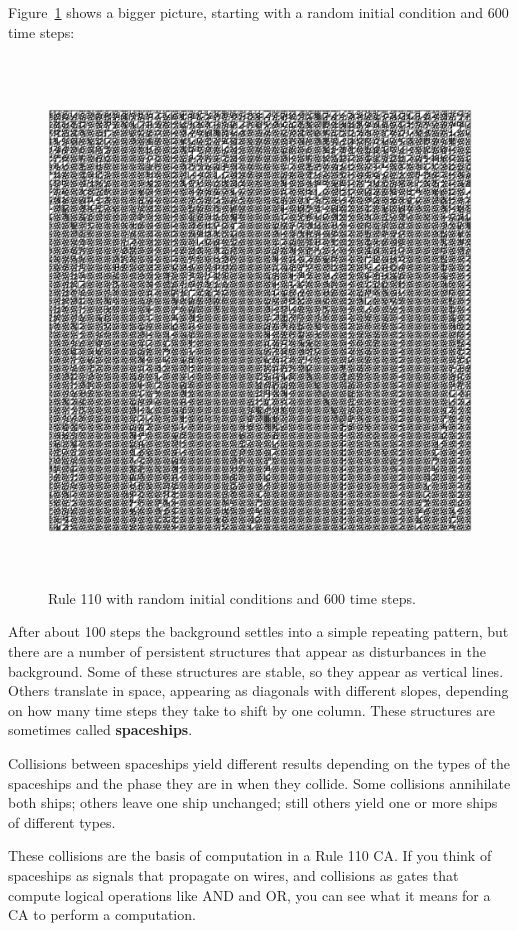\documentclass[10pt]{book}
\begin{document}
Figure~\ref{rule110} shows a bigger picture, starting with a random initial
condition and 600 time steps:

\begin{figure}
\centerline{\includegraphics[width=5.5in,height=5.5in]{figs/rule-110-600-random.pdf}}
\caption{Rule 110 with random initial conditions and 600 time steps.\label{rule110}}
\end{figure}

After about 100 steps the background settles into a simple repeating
pattern, but there are a number of persistent structures that appear
as disturbances in the background.  Some of these structures
are stable, so they appear as vertical lines.  Others translate in
space, appearing as diagonals with different slopes, depending on
how many time steps they take to shift by one column.  These
structures are sometimes called {\bf spaceships}.

Collisions between spaceships yield different results
depending on the types of the spaceships and the phase they are in
when they collide.  Some collisions annihilate both ships; others
leave one ship unchanged; still others yield one or more ships of
different types.

These collisions are the basis of computation in a Rule 110 CA.  If
you think of spaceships as signals that propagate on wires, and
collisions as gates that compute logical operations like AND and OR,
you can see what it means for a CA to perform a computation.
\end{document}
